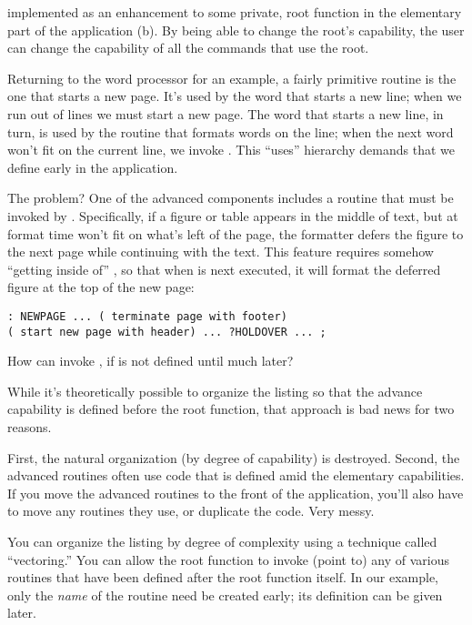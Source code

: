 
implemented as an enhancement to some private, root function in the
elementary part of the application (b). By being able to
change the root's capability, the user can change the capability of all the
commands that use the root.

Returning to the word processor for an example, a fairly primitive
routine is the one that starts a new page. It's used by the word that
starts a new line; when we run out of lines we must start a new
page. The word that starts a new line, in turn, is used by the routine
that formats words on the line; when the next word won't fit on the
current line, we invoke . This ``uses'' hierarchy demands that
we define  early in the application.

The problem? One of the advanced components includes a routine that
must be invoked by . Specifically, if a figure or table appears
in the middle of text, but at format time won't fit on what's left of
the page, the formatter defers the figure to the next page while
continuing with the text. This feature requires somehow ``getting
inside of'' , so that when  is next executed, it will
format the deferred figure at the top of the new page:

\begin{verbatim}
: NEWPAGE ... ( terminate page with footer)
( start new page with header) ... ?HOLDOVER ... ;
\end{verbatim}

How can  invoke , if  is not
defined until much later?

While it's theoretically possible to organize the listing so that the
advance capability is defined before the root function, that approach is
bad news for two reasons.

First, the natural organization (by degree of capability) is
destroyed. Second, the advanced routines often use code that is defined
amid the elementary capabilities. If you move the advanced routines to
the front of the application, you'll also have to move any routines they
use, or duplicate the code. Very messy.

You can organize the listing by degree of complexity using a technique
called ``vectoring.'' You can allow the root function to invoke (point
to) any of various routines that have been defined after the root
function itself. In our example, only the \emph{name} of the routine
 need be created early; its definition can be given later.

